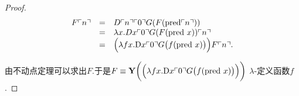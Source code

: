 
\begin{proof}


\[
  \begin{array}{rcl}
  F\churchnumber{n} & = & D\churchnumber{n}\churchnumber{0} G(F(\mathrm{pred} \churchnumber{n})) \\
  & = & \lambda x. Dx\churchnumber{0} G(F(\mathrm{pred}\ x))  \churchnumber{n} \\
  & = & \Big(\lambda fx.\mathrm{D}x\churchnumber{0}G \big(f(\mathrm{pred}\ x) \big)\Big) F \churchnumber{n}. \\
  \end{array}
\]



由不动点定理可以求出$F$.于是$F\equiv \mathbf{Y} \bigg( \Big(\lambda fx.\mathrm{D}x\ulcorner{0}\urcorner G \big(f(\mathrm{pred}\ x) \big)\Big) \bigg)$ $\lambda$-定义函数$f$.
\end{proof}